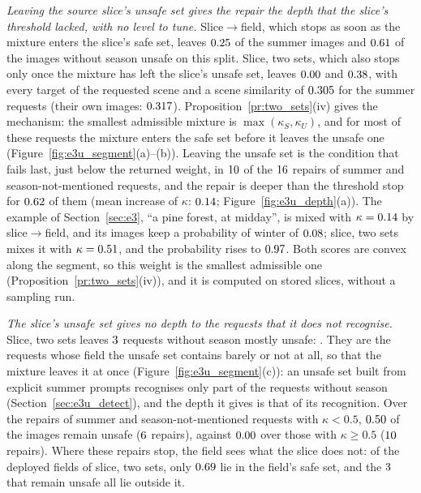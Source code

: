 \documentclass{article}
\theoremstyle{plain}
\theoremstyle{remark}
\begin{document}
\emph{Leaving the source slice's unsafe set gives the repair the depth that the slice's threshold lacked, with no level to tune.}
Slice$\to$field, which stops as soon as the mixture enters the slice's safe set, leaves $0.25$ of the summer images and
$0.61$ of the images without season unsafe on this split. Slice, two sets, which also stops only once the mixture has left the
slice's unsafe set, leaves $0.00$ and $0.38$, with every target of the requested scene and a scene similarity of
$0.305$ for the summer requests (their own images: $0.317$). Proposition~\ref{pr:two_sets}(iv) gives the mechanism:
the smallest admissible mixture is $\max(\kappa_S,\kappa_U)$, and for most of these requests the mixture enters the safe set before it
leaves the unsafe one (Figure~\ref{fig:e3u_segment}(a)--(b)). Leaving the unsafe set is the condition that fails last, just below the
returned weight, in $10$ of the $16$ repairs of summer and season-not-mentioned requests, and the repair
is deeper than the threshold stop for $0.62$ of them (mean increase of $\kappa$: $0.14$;
Figure~\ref{fig:e3u_depth}(a)). The example of Section~\ref{sec:e3}, ``a pine forest, at midday'', is mixed with
$\kappa=0.14$ by slice$\to$field, and its images keep a probability of winter of $0.08$; slice, two sets mixes it
with $\kappa=0.51$, and the probability rises to $0.97$. Both scores are convex along the segment, so this
weight is the smallest admissible one (Proposition~\ref{pr:two_sets}(iv)), and it is computed on stored slices, without a sampling run.

\emph{The slice's unsafe set gives no depth to the requests that it does not recognise.} Slice, two sets leaves $3$ requests
without season mostly unsafe: \ethuBadNeuStwo. They are the requests whose field the unsafe set contains barely or not at all, so that the
mixture leaves it at once (Figure~\ref{fig:e3u_segment}(c)): an unsafe set built from explicit summer prompts recognises only part of
the requests without season (Section~\ref{sec:e3u_detect}), and the depth it gives is that of its recognition. Over the repairs of summer
and season-not-mentioned requests with $\kappa<0.5$, $0.50$ of the images remain unsafe ($6$ repairs), against
$0.00$ over those with $\kappa\ge0.5$ ($10$ repairs). Where these repairs stop, the field sees what the slice
does not: of the deployed fields of slice, two sets, only $0.69$ lie in the field's safe set, and the $3$ that
remain unsafe all lie outside it.
\end{document}
